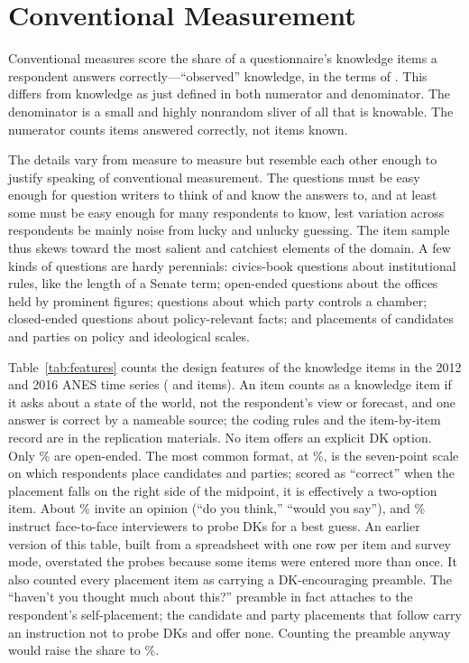 \documentclass[11pt]{article}
\begin{document}
\section{Conventional Measurement}

Conventional measures score the share of a questionnaire's knowledge items a respondent answers correctly---``observed'' knowledge, in the terms of \citet{luskin2026}. This differs from knowledge as just defined in both numerator and denominator. The denominator is a small and highly nonrandom sliver of all that is knowable. The numerator counts items answered correctly, not items known.

The details vary from measure to measure but resemble each other enough to justify speaking of conventional measurement. The questions must be easy enough for question writers to think of and know the answers to, and at least some must be easy enough for many respondents to know, lest variation across respondents be mainly noise from lucky and unlucky guessing. The item sample thus skews toward the most salient and catchiest elements of the domain. A few kinds of questions are hardy perennials: civics-book questions about institutional rules, like the length of a Senate term; open-ended questions about the offices held by prominent figures; questions about which party controls a chamber; closed-ended questions about policy-relevant facts; and placements of candidates and parties on policy and ideological scales.

Table~\ref{tab:features} counts the design features of the \nItems{} knowledge items in the 2012 and 2016 ANES time series (\nItemsTwelve{} and \nItemsSixteen{} items). An item counts as a knowledge item if it asks about a state of the world, not the respondent's view or forecast, and one answer is correct by a nameable source; the coding rules and the item-by-item record are in the replication materials. No item offers an explicit DK option. Only \featOpen\% are open-ended. The most common format, at \featSeven\%, is the seven-point scale on which respondents place candidates and parties; scored as ``correct'' when the placement falls on the right side of the midpoint, it is effectively a two-option item. About \featOpinion\% invite an opinion (``do you think,'' ``would you say''), and \featProbe\% instruct face-to-face interviewers to probe DKs for a best guess. An earlier version of this table, built from a spreadsheet with one row per item and survey mode, overstated the probes because some items were entered more than once. It also counted every placement item as carrying a DK-encouraging preamble. The ``haven't you thought much about this?'' preamble in fact attaches to the respondent's self-placement; the candidate and party placements that follow carry an instruction not to probe DKs and offer none. Counting the preamble anyway would raise the share to \featSelfFilter\%.
\end{document}
